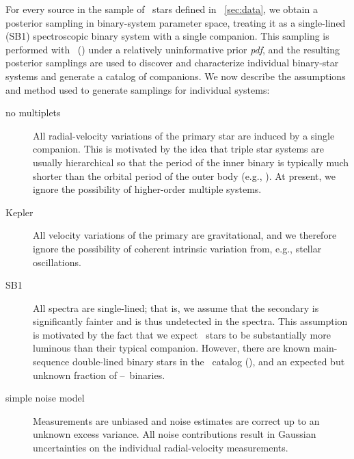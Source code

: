 \documentclass[modern, letterpaper]{aastex62}
\newcommand{\apogee}{\project{\acronym{APOGEE}}}
\newcommand{\thejoker}{\project{The~Joker}}
\newcommand{\RGB}{\acronym{RGB}}
\newcommand{\pdf}{\textit{pdf}}
\begin{document}
For every source in the sample of \apogee\ stars defined in
\sectionname~\ref{sec:data}, we obtain a posterior sampling in binary-system
parameter space, treating it as a single-lined (SB1) spectroscopic binary system
with a single companion.
This sampling is performed with \thejoker\ (\citealt{Price-Whelan:2017}) under a
relatively uninformative prior \pdf, and the resulting posterior samplings are
used to discover and characterize individual binary-star systems and generate a
catalog of companions.
We now describe the assumptions and method used to generate samplings for
individual systems:
\begin{description}
\item[no multiplets] All radial-velocity variations of the primary star are
  induced by a single companion.
  This is motivated by the idea that triple star systems are usually
  hierarchical so that the period of the inner binary is typically much shorter
  than the orbital period of the outer body (e.g., \citealt{Tokovinin:2018}).
  At present, we ignore the possibility of higher-order multiple systems.
\item[Kepler] All velocity variations of the primary
  are gravitational, and we therefore ignore the possibility of coherent
  intrinsic variation from, e.g., stellar oscillations.
\item[SB1] All spectra are single-lined; that is, we assume that the secondary
  is significantly fainter and is thus undetected in the spectra.
  This assumption is motivated by the fact that we expect \RGB\ stars to be
  substantially more luminous than their typical companion.
  However, there are known main-sequence double-lined binary stars in the
  \apogee\ catalog (\citealt{El-Badry:2018}), and an expected but unknown
  fraction of \RGB--\RGB\ binaries.
\item[simple noise model] Measurements are unbiased and noise estimates are
  correct up to an unknown excess variance.
  All noise contributions result in Gaussian uncertainties on the individual
  radial-velocity measurements.
\end{description}
\end{document}
